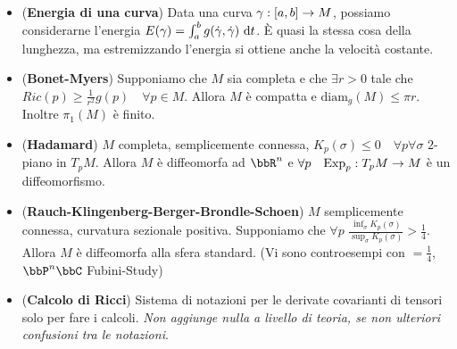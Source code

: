 \documentclass[a4paper,NoNotes,GeneralMath]{stdmdoc}
\newcommand{\Exp}{\ensuremath{\text{Exp}}}
\begin{document}
\begin{itemize}
\begin{enumerate}
  \end{enumerate}
\item ({\bf Energia di una curva}) Data una curva $\gamma: [a, b] \rightarrow M$, possiamo considerarne l'energia $E(\gamma) = \int_a^b g(\dot\gamma, \dot\gamma) \de t$. È quasi la stessa cosa della lunghezza, ma estremizzando l'energia si ottiene anche la velocità costante.
\item ({\bf Bonet-Myers}) Supponiamo che $M$ sia completa e che $\exists r > 0$ tale che $Ric(p) \ge \frac{1}{r^2} g(p) \quad \forall p \in M$. Allora $M$ è compatta e $\text{diam}_g (M) \le \pi r$. Inoltre $\pi_1(M)$ è finito.
\item ({\bf Hadamard}) $M$ completa, semplicemente connessa, $K_p (\sigma) \le 0 \quad \forall p \forall \sigma$ $2$-piano in $T_pM$. Allora $M$ è diffeomorfa ad $\bbR^n$ e $\forall p \quad \Exp_p : T_pM \rar M$ è un diffeomorfismo.
\item ({\bf Rauch-Klingenberg-Berger-Brondle-Schoen}) $M$ semplicemente connessa, curvatura sezionale positiva. Supponiamo che $\forall p$ $\frac{\inf_\sigma K_p (\sigma)}{\sup_\sigma K_p (\sigma)} > \frac{1}{4}$. Allora $M$ è diffeomorfa alla sfera standard. (Vi sono controesempi con $=\frac{1}{4}$, $\bbP^n\bbC$ Fubini-Study)
\item ({\bf Calcolo di Ricci}) Sistema di notazioni per le derivate covarianti di tensori solo per fare i calcoli. {\it Non aggiunge nulla a livello di teoria, se non ulteriori confusioni tra le notazioni}.
\end{itemize}
\end{document}
